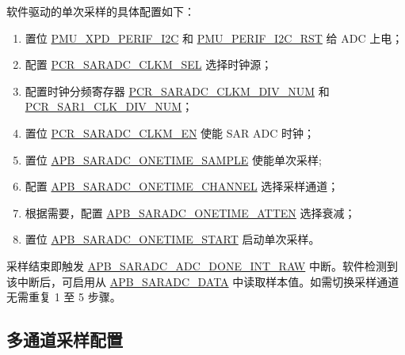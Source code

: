 \documentclass[main\_\_CN.tex]{subfiles}
\begin{document}
软件驱动的单次采样的具体配置如下：
\begin{enumerate}
    \item 置位 \hyperref[fielddesc:PMUXPDPERIFI2C]{PMU\_XPD\_PERIF\_I2C} 和 \hyperref[fielddesc:PMUPERIFI2CRST]{PMU\_PERIF\_I2C\_RST} 给 ADC 上电；
    \item 配置 \hyperref[fielddesc:PCRSARADCCLKMSEL]{PCR\_SARADC\_CLKM\_SEL} 选择时钟源；
    \item 配置时钟分频寄存器 \hyperref[fielddesc:PCRSARADCCLKMSEL]{PCR\_SARADC\_CLKM\_DIV\_NUM} 和 \hyperref[fielddesc:PCRSAR1CLKDIVNUM]{PCR\_SAR1\_CLK\_DIV\_NUM}；
    \item 置位 \hyperref[fielddesc:PCRSARADCCLKMEN]{PCR\_SARADC\_CLKM\_EN} 使能 SAR ADC 时钟；
    \item 置位 \hyperref[fielddesc:APBSARADCONETIMESAMPLE]{APB\_SARADC\_ONETIME\_SAMPLE} 使能单次采样;
    \item 配置 \hyperref[fielddesc:APBSARADCONETIMECHANNEL]{APB\_SARADC\_ONETIME\_CHANNEL} 选择采样通道；
    \item 根据需要，配置 \hyperref[fielddesc:APBSARADCONETIMEATTEN]{APB\_SARADC\_ONETIME\_ATTEN} 选择衰减；
    \item 置位 \hyperref[fielddesc:APBSARADCONETIMESTART]{APB\_SARADC\_ONETIME\_START} 启动单次采样。
\end{enumerate}

采样结束即触发 \hyperref[fielddesc:APBSARADCDONEINTRAW]{APB\_SARADC\_ADC\_DONE\_INT\_RAW} 中断。软件检测到该中断后，可启用从 \hyperref[fielddesc:APBSARADCDATA]{APB\_SARADC\_DATA} 中读取样本值。如需切换采样通道无需重复 1 至 5 步骤。

\subsection{多通道采样配置}
\end{document}
